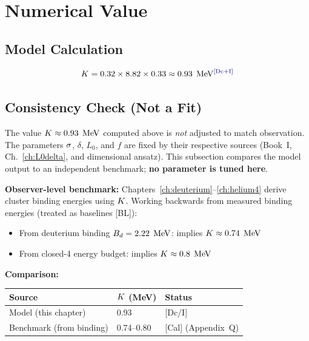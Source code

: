 \section{Numerical Value}
\label{sec:sigmaK:numerical}

\subsection{Model Calculation}

\begin{equation}
    \Kpin = 0.32 \times 8.82 \times 0.33 \approx 0.93\;\MeV \tagDcI
    \label{eq:K_numerical}
\end{equation}

\subsection{Consistency Check (Not a Fit)}

\begin{tcolorbox}[colback=yellow!5,colframe=orange!50!black,title=Anti-Tuning Declaration]
The value $K \approx 0.93\;\,\mathrm{MeV}$ computed above is \emph{not} adjusted to
match observation. The parameters $\sigma$, $\delta$, $L_0$, and $f$ are fixed
by their respective sources (Book~I, Ch.~\ref{ch:L0delta}, and dimensional
ansatz). This subsection compares the model output to an independent benchmark;
\textbf{no parameter is tuned here}.
\end{tcolorbox}

\textbf{Observer-level benchmark:} Chapters~\ref{ch:deuterium}--\ref{ch:helium4}
derive cluster binding energies using $K$. Working backwards from measured
binding energies (treated as baselines [BL]):
\begin{itemize}
    \item From deuterium binding $B_d = 2.22\;\,\mathrm{MeV}$: implies $K \approx 0.74\;\,\mathrm{MeV}$
    \item From closed-4 energy budget: implies $K \approx 0.8\;\,\mathrm{MeV}$
\end{itemize}

\textbf{Comparison:}
\begin{center}
\begin{tabular}{lll}
    \toprule
    Source & $K$ (MeV) & Status \\
    \midrule
    Model (this chapter) & 0.93 & [Dc/I] \\
    Benchmark (from binding) & 0.74--0.80 & [Cal] (Appendix~Q) \\
    \bottomrule
\end{tabular}
\end{center}

